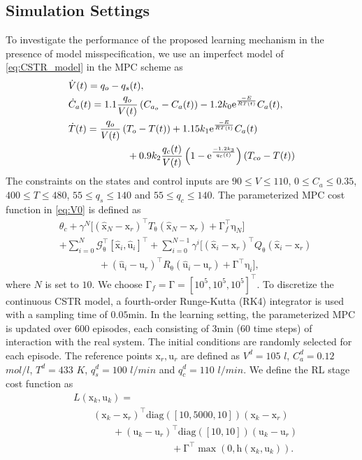 \documentclass[10pt,twocolumn,twoside]{IEEEtran}
\newcommand{\vect}[1]{\ensuremath{\boldsymbol{\mathrm{#1}}}}
\begin{document}
\subsection{Simulation Settings}
To investigate the performance of the proposed learning mechanism in the presence of model misspecification, we use an imperfect model of \eqref{eq:CSTR_model} in the MPC scheme as
\begin{subequations}\label{eq:CSTR_Wrongmodel}
		\begin{align}
         &\dot{V}(t)=q_o-q_s(t),\\
         &\dot{C}_a(t)=1.1\frac{q_o}{V(t)}\left(C_{a_o}-C_a(t)\right)-1.2k_0{\rm e}^{\frac{-E}{RT(t)}}C_a(t),\\
         &\dot{T}(t)=\frac{q_o}{V(t)}\left(T_o-T(t)\right)+1.15k_1{\rm e}^{\frac{-E}{RT(t)}}C_a(t)\\\nonumber
         &\qquad\qquad\qquad+0.9k_2\frac{q_c(t)}{V(t)}\left(1-{\rm e}^{\frac{-1.2k_3}{q_c(t)}}\right)\left(T_{co}-T(t)\right)
		\end{align}
\end{subequations}
The constraints on the states and control inputs are $90\leq V\leq 110$, $0\leq C_a\leq 0.35$, $400\leq T\leq 480$, $55\leq q_s\leq 140$ and $55\leq q_c\leq 140$.
The parameterized MPC cost function in \eqref{eq:V0} is defined as
\begin{align}
    &\theta_c+\gamma^N\Big[(\hat{\vect x}_N-\vect x_r)^\top T_{\vect\theta}(\hat{\vect x}_N-\vect x_r)+\vect \Gamma_f^\top\vect\eta_N\Big]\\\nonumber
    &+\sum_{i=0}^N\mathcal{G}_{\vect\theta}^\top[\hat{\vect x}_i,\hat{\vect u}_i]^\top+\sum_{i=0}^{N-1}\gamma^i\Big[(\hat{\vect x}_i-\vect x_r)^\top Q_{\vect\theta}(\hat{\vect x}_i-\vect x_r)\\\nonumber
    &\qquad\qquad+(\hat{\vect u}_i-\vect u_r)^\top R_{\vect\theta}(\hat{\vect u}_i-\vect u_r)+\vect \Gamma^\top\vect\eta_i\Big],
\end{align}
where $N$ is set to $10$. We choose $\vect\Gamma_f=\vect\Gamma=[10^5,10^5,10^5]^\top$. To discretize the continuous CSTR model, a fourth-order Runge-Kutta (RK4) integrator is used with a sampling time of $0.05 \text{min}$. In the learning setting, the parameterized MPC is updated over $600$ episodes, each consisting of $3\text{min}$ ($60$ time steps) of interaction with the real system. The initial conditions are randomly selected for each episode. The reference points $\vect x_r,\vect u_r$ are defined as $V^d=105$ $l$, $C_a^d=0.12$ $mol/l$, $T^d=433$ $K$, $q_s^d=100$ $l/min$ and $q_c^d=110$ $l/min$. We define the RL stage cost function as
\begin{align}
    &L\left(\vect x_k,\vect u_k\right)=\\\nonumber
    &\qquad(\vect x_k-\vect x_r)^\top\text{diag}([10,5000,10])(\vect x_k-\vect x_r)\\\nonumber
    &\qquad\qquad+(\vect u_k-\vect u_r)^\top\text{diag}([10,10])(\vect u_k-\vect u_r)\\\nonumber
    &\qquad\qquad\qquad\qquad\qquad+\vect\Gamma^\top\max(0,\vect h(\vect x_k,\vect u_k)).
\end{align}
\end{document}
